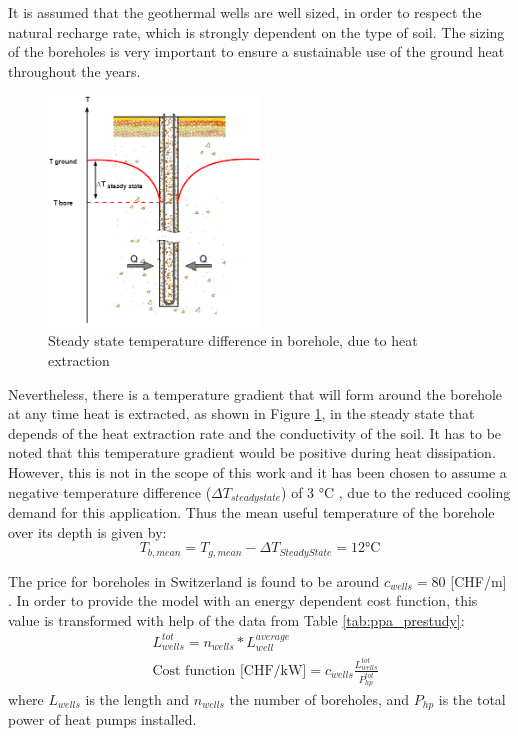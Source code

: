 \documentclass{article}
\begin{document}
It is assumed that the geothermal wells are well sized, in order to respect the natural recharge rate, which is strongly dependent on the type of soil. The sizing of the boreholes is very important to ensure a sustainable use of the ground heat throughout the years. \\

\begin{figure}[htp]
	\centering
	\includegraphics[width=0.5\textwidth]{GTW_T_profile.png}
	\caption{Steady state temperature difference in borehole, due to heat extraction}
	\label{fig:GTW_T}
\end{figure}

Nevertheless, there is a temperature gradient that will form around the borehole at any time heat is extracted, as shown in Figure \ref{fig:GTW_T}, in the steady state that depends of the heat extraction rate and the conductivity of the soil. It has to be noted that this temperature gradient would be positive during heat dissipation. However, this is not in the scope of this work and it has been chosen to assume a negative temperature difference ($\Delta T_{steady state}$) of 3 \si{\celsius} \cite{guoTechnoeconomicComparisonDirect2012,hanSensitivityAnalysisVertical2016}, due to the reduced cooling demand for this application.
Thus the mean useful temperature of the borehole over its depth is given by:
\begin{equation}
	T_{b, mean} = T_{g, mean} -\Delta T_{Steady State} = 12 \si{\celsius}
\end{equation}

The price for boreholes in Switzerland is found to be around $c_{wells} = 80$ [CHF/m] \cite{bawos.chMitErdsondenbohrungenKosten2018}. 
In order to provide the model with an energy dependent cost function, this value is transformed with help of the data from Table \ref{tab:ppa_prestudy}:
\begin{align}
&  L_{wells}^{tot} = n_{wells} * L_{well}^{average} \\
& 	\text{Cost function [CHF/kW]} = c_{wells} \frac{L_{wells}^{tot}}{P_{hp}^{tot}}
\end{align}
where $L_{wells}$ is the length and $n_{wells}$ the number of boreholes, and $P_{hp}$ is the total power of heat pumps installed. 
\end{document}
